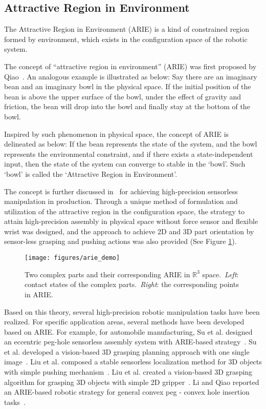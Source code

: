 \documentclass[journal,twoside,web]{ieeecolor}
\begin{document}
\subsection{Attractive Region in Environment}
\label{subsec:arie}

The Attractive Region in Environment (ARIE) is a kind of constrained region formed by environment, which exists in the configuration space of the robotic system.  

The concept of ``attractive region in environment'' (ARIE) was first proposed by Qiao~\cite{Qiao2000}. An analogous example is illustrated as below: Say there are an imaginary bean and an imaginary bowl in the physical space. If the initial position of the bean is above the upper surface of the bowl, under the effect of gravity and friction, the bean will drop into the bowl and finally stay at the bottom of the bowl.

Inspired by such phenomenon in physical space, the concept of ARIE is delineated as below: If the bean represents the state of the system, and the bowl represents the environmental constraint, and if there exists a state-independent input, then the state of the system can converge to stable in the `bowl'. Such `bowl' is called the `Attractive Region in Environment'.

The concept is further discussed in~\cite{Qiao2002, Qiao2003} for achieving high-precision sensorless manipulation in production. Through a unique method of formulation and utilization of the attractive region in the configuration space, the strategy to attain high-precision assembly in physical space without force sensor and flexible wrist was designed, and the approach to achieve 2D and 3D part orientation by sensor-less grasping and pushing actions was also provided (See Figure \ref{fig:arie}).



\begin{figure}[ht]
    \centering
    \texttt{[image: figures/arie\_demo]}
    \caption{Two complex parts and their corresponding ARIE in $\mathbb{R}^3$ space.~\textit{Left}: contact states of the complex parts.~\textit{Right}: the corresponding points in ARIE.}
    \label{fig:arie}
\end{figure}


Based on this theory, several high-precision robotic manipulation tasks have been realized. For specific application areas, several methods have been developed based on ARIE. 
For example, for automobile manufacturing, 
Su et al. designed an eccentric peg-hole sensorless assembly system with ARIE-based strategy~\cite{Su2012a, Su2012b}. 
Su et al. developed a vision-based 3D grasping planning approach with one single image~\cite{Su2009}. 
Liu et al. composed a stable sensorless localization method for 3D objects with simple pushing mechanism~\cite{Liu2011}. 
Liu et al. created a vision-based 3D grasping algorithm for grasping 3D objects with simple 2D gripper~\cite{Liu2014}.
Li and Qiao reported an ARIE-based robotic strategy for general convex peg - convex hole insertion tasks~\cite{Li2017}.
\end{document}
